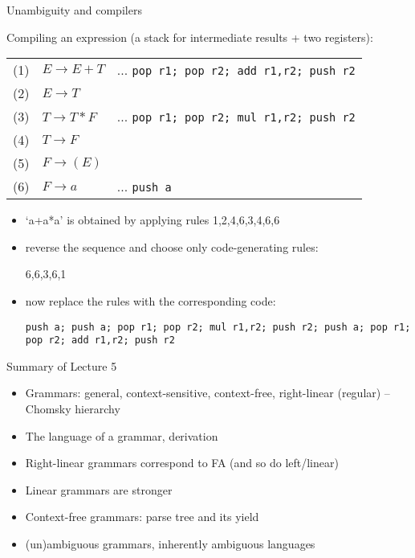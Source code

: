 \documentclass[handout]{beamer}
\begin{document}
\begin{frame}{Unambiguity and compilers}

	Compiling an expression (a stack for intermediate results + two registers):
	
	\begin{tabular}{c l l}
		(1) &$E\rightarrow  E+T $ & ... \texttt{pop r1; pop r2; add r1,r2; push r2}\\
		(2) &$E\rightarrow  T $ & \\
		(3) &$T\rightarrow  T*F $& ... \texttt{pop r1; pop r2; mul r1,r2; push r2}\\
		(4) &$T\rightarrow  F $& \\
		(5) &$F\rightarrow (E) $& \\
		(6) &$F\rightarrow a $& ... \texttt{push a}
	\end{tabular}

	\begin{itemize}
		\item `a+a*a' is obtained by applying rules 1,2,4,6,3,4,6,6
		\item reverse the sequence and choose only code-generating rules:
		
		6,6,3,6,1

		\item now replace the rules with the corresponding code:
		
		\texttt{push a; push a; pop r1; pop r2; mul r1,r2; push r2; push a; pop r1; pop r2; add r1,r2; push r2} 
	\end{itemize}

\end{frame}


\begin{frame}{Summary of Lecture 5}
	
	\begin{itemize}
		\item Grammars: general, context-sensitive, context-free, right-linear (regular) -- Chomsky hierarchy
		\item The language of a grammar, derivation
		\item Right-linear grammars correspond to FA (and so do left/linear)
		\item Linear grammars are stronger
		\item Context-free grammars: parse tree and its yield
		\item (un)ambiguous grammars, inherently ambiguous languages
	\end{itemize}

\end{frame}
\end{document}
